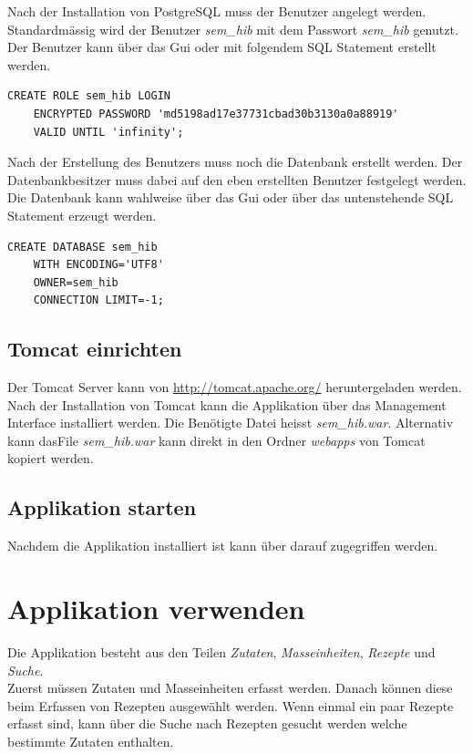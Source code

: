 Nach der Installation von PostgreSQL muss der Benutzer angelegt werden. Standardmässig wird der Benutzer \emph{sem\_hib} mit dem Passwort \emph{sem\_hib} genutzt. Der Benutzer kann über das Gui oder mit folgendem SQL Statement erstellt werden.

\begin{lstlisting}
CREATE ROLE sem_hib LOGIN
	ENCRYPTED PASSWORD 'md5198ad17e37731cbad30b3130a0a88919'
	VALID UNTIL 'infinity';
\end{lstlisting}

Nach der Erstellung des Benutzers muss noch die Datenbank erstellt werden. Der Datenbankbesitzer muss dabei auf den eben erstellten Benutzer festgelegt werden. Die Datenbank kann wahlweise über das Gui oder über das untenstehende SQL Statement erzeugt werden.

\begin{lstlisting}
CREATE DATABASE sem_hib
	WITH ENCODING='UTF8'
	OWNER=sem_hib
	CONNECTION LIMIT=-1;
\end{lstlisting}


\subsection{Tomcat einrichten}
Der Tomcat Server kann von \url{http://tomcat.apache.org/} heruntergeladen werden.
Nach der Installation von Tomcat kann die Applikation über das Management Interface installiert werden. Die Benötigte Datei heisst \emph{sem\_hib.war}. Alternativ kann dasFile \emph{sem\_hib.war} kann direkt in den Ordner \emph{webapps} von Tomcat kopiert werden.

\subsection{Applikation starten}
Nachdem die Applikation installiert ist kann über  darauf zugegriffen werden.

\section{Applikation verwenden}
Die Applikation besteht aus den Teilen \emph{Zutaten}, \emph{Masseinheiten}, \emph{Rezepte} und \emph{Suche}.\\
Zuerst müssen Zutaten und Masseinheiten erfasst werden. Danach können diese beim Erfassen von Rezepten ausgewählt werden. Wenn einmal ein paar Rezepte erfasst sind, kann über die Suche nach Rezepten gesucht werden welche bestimmte Zutaten enthalten.

